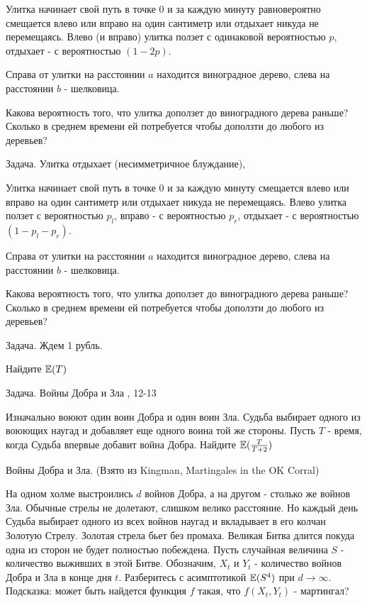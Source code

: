 {Улитка начинает свой путь в точке 0 и за каждую минуту равновероятно смещается влево или вправо на один сантиметр или отдыхает никуда не перемещаясь. Влево (и вправо) улитка ползет с одинаковой вероятностью $p$, отдыхает - с вероятностью $(1-2p)$.

Справа от улитки на расстоянии $a$ находится виноградное дерево, слева на расстоянии $b$ - шелковица.

Какова вероятность того, что улитка доползет до виноградного дерева раньше? Сколько в среднем времени ей потребуется чтобы доползти до любого из деревьев?



Задача. Улитка отдыхает (несимметричное блуждание), \cite{blom:pspt}

Улитка начинает свой путь в точке 0 и за каждую минуту смещается влево или вправо на один сантиметр или отдыхает никуда не перемещаясь. Влево улитка ползет с вероятностью $p_{l}$, вправо - с вероятностью $p_{r}$, отдыхает - с вероятностью $(1-p_{l}-p_{r})$.

Справа от улитки на расстоянии $a$ находится виноградное дерево, слева на расстоянии $b$ - шелковица.

Какова вероятность того, что улитка доползет до виноградного дерева раньше? Сколько в среднем времени ей потребуется чтобы доползти до любого из деревьев?

Задача. Ждем 1 рубль.

Найдите $\mathbb{E}(T)$


Задача. Войны Добра и Зла \cite{stirzaker:otep}, 12-13

Изначально воюют один воин Добра и один воин Зла. Судьба выбирает одного из воюющих наугад и добавляет еще одного воина той же стороны. Пусть $T$ - время, когда Судьба впервые добавит война Добра. Найдите $\mathbb{E}(\frac{T}{T+2})$


Войны Добра и Зла. (Взято из  Kingman, Martingales in the OK Corral)

На одном холме выстроились $d$ войнов Добра, а на другом - столько же войнов Зла. Обычные стрелы не долетают, слишком велико расстояние. Но каждый день Судьба выбирает одного из всех войнов наугад и вкладывает в его колчан Золотую Стрелу. Золотая стрела бьет без промаха. Великая Битва длится покуда одна из сторон не будет полностью побеждена. Пусть случайная величина $S$ - количество выживших в этой Битве. Обозначим, $X_{t}$ и $Y_{t}$ - количество войнов Добра и Зла в конце дня $t$.  Разберитесь с асимптотикой $\mathbb{E}(S^{4})$ при $d\to\infty$. Подсказка: может быть найдется функция $f$ такая, что $f(X_{t},Y_{t})$ - мартингал?

}

